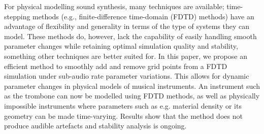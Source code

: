 For physical modelling sound synthesis, many techniques are available; time-stepping methods (e.g., finite-difference time-domain (FDTD) methods) have an advantage of flexibility and generality in terms of the type of systems they can model. These methods do, however, lack the capability of easily handling smooth parameter changes 
while retaining optimal simulation quality and stability, something other techniques are better suited for. In this paper, we propose an efficient method to smoothly add and remove grid points from a FDTD simulation under sub-audio rate parameter variations. This allows for dynamic parameter changes in physical models of musical instruments. An instrument such as the trombone can now be modelled using FDTD methods, as well as physically impossible instruments where parameters such as e.g. material density or its geometry can be made time-varying. Results show that the method does not produce audible artefacts and stability analysis is ongoing.

